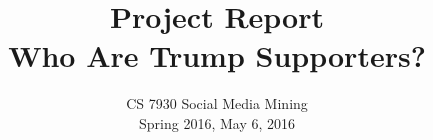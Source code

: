 \documentclass{sig-alternate-05-2015}
\begin{document}



%

\title{Project Report\\Who Are Trump Supporters?}
\subtitle{CS 7930 Social Media Mining\\
Spring 2016, May 6, 2016\\
}
%
%
%
%
%
\end{document}
